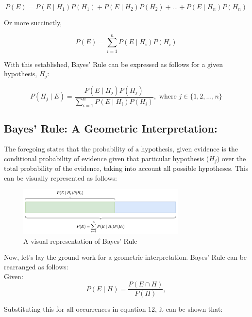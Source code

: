 \documentclass[12pt]{article}
\begin{document}
\begin{equation}
P(E) = P(E \mid H_1) P(H_1) + P(E \mid H_2) P(H_2) + ... + P(E \mid H_n) P(H_n)
\end{equation}

\noindent Or more succinctly, 

\begin{equation}
P(E) = \sum_{i=1}^{n} P(E \mid H_i) P(H_i)
\end{equation}

\noindent With this established, Bayes' Rule can be expressed as follows for a given hypothesis, $H_j$: 

\begin{equation}
P(H_j \mid E) = \frac{P(E \mid H_j) P(H_j)}{\sum_{i=1}^{n} P(E \mid H_i) P(H_i)}, \text{ where } j \in \{1, 2, \ldots, n\}
\end{equation}

\subsection*{Bayes' Rule: A Geometric Interpretation:}
\noindent The foregoing states that the probability of a hypothesis, given evidence is the conditional probability of evidence given that particular hypothesis ($H_j$) over the total probability of the evidence, taking into account all possible hypotheses. This can be visually represented as follows: \\

\begin{figure}[h!]
\centering
\includegraphics[width=0.75\textwidth]{assets/visual_2.png} 
\caption{A visual representation of Bayes' Rule}
\label{fig:cond_prob}
\end{figure}

\noindent Now, let's lay the ground work for a geometric interpretation. Bayes' Rule can be rearranged as follows:\\

\noindent Given:
\begin{equation}
P(E \mid H) = \frac{P(E \cap H)}{P(H)},
\end{equation}

\noindent Substituting this for all occurrences in equation 12, it can be shown that:
\end{document}

